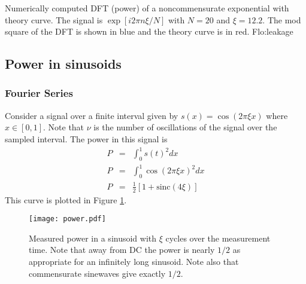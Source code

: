 \documentclass[twocolumn]{article}
\begin{document}
{Numerically computed DFT (power) of a noncommensurate exponential
with theory curve. The signal is $\exp\left[i2\pi n\xi/N\right]$
with $N=20$ and $\xi=12.2$. The mod square of the DFT is shown in
blue and the theory curve is in red.}
{Flo:leakage}


\subsection{Power in sinusoids}

\subsubsection{Fourier Series}

Consider a signal over a finite interval given by $s(x)=\cos(2\pi\xi x)$
where $x\in[0,1]$. Note that $\nu$ is the number of oscillations
of the signal over the sampled interval. The power in this signal
is \begin{eqnarray*}
P & = & \int_{0}^{1}s(t)^{2}dx\\
P & = & \int_{0}^{1}\cos(2\pi\xi x)^{2}dx\\
P & = & \frac{1}{2}\left[1+\textrm{sinc}\left(4\xi\right)\right]\end{eqnarray*}
This curve is plotted in Figure \ref{Flo:PowerFromNoncommensurateSinusoid}.

%
\begin{figure}
\begin{centering}
\texttt{[image: power.pdf]}
\par\end{centering}

\caption{Measured power in a sinusoid with $\xi$ cycles over the measurement
time. Note that away from DC the power is nearly $1/2$ as appropriate
for an infinitely long sinusoid. Note also that commensurate sinewaves
give exactly $1/2$.}


\label{Flo:PowerFromNoncommensurateSinusoid}
\end{figure}
\end{document}
